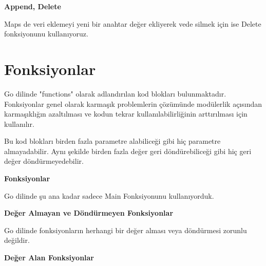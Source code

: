 \vspace{10mm}
\textbf{Append, Delete}
\vspace{5mm}

Maps de veri eklemeyi yeni bir anahtar değer ekliyerek vede silmek için ise Delete fonksiyonunu kullanıyoruz.
\vspace{5mm}


\newpage

\section{Fonksiyonlar}

\vspace{10mm}

Go dilinde "functions" olarak adlandırılan kod blokları bulunmaktadır. Fonksiyonlar genel olarak karmaşık problemlerin çözümünde modülerlik açısından karmaşıklığın azaltılması ve kodun tekrar kullanılabilirliğinin arttırılması için kullanılır.
\vspace{5mm}

Bu kod blokları birden fazla parametre alabiliceği gibi hiç parametre almayadabilir. Aynı şekilde birden fazla değer geri döndürebiliceği gibi hiç geri değer döndürmeyedebilir.

\vspace{20mm}


\textbf{Fonksiyonlar}
\vspace{5mm}

Go dilinde şu ana kadar sadece Main Fonksiyonunu kullanıyorduk. 
\vspace{5mm}


\vspace{10mm}
\textbf{Değer Almayan ve Döndürmeyen Fonksiyonlar}
\vspace{5mm}

Go dilinde fonksiyonların herhangi bir değer alması veya döndürmesi zorunlu değildir.
\vspace{5mm}



\vspace{10mm}
\textbf{Değer Alan Fonksiyonlar}
\vspace{5mm}

